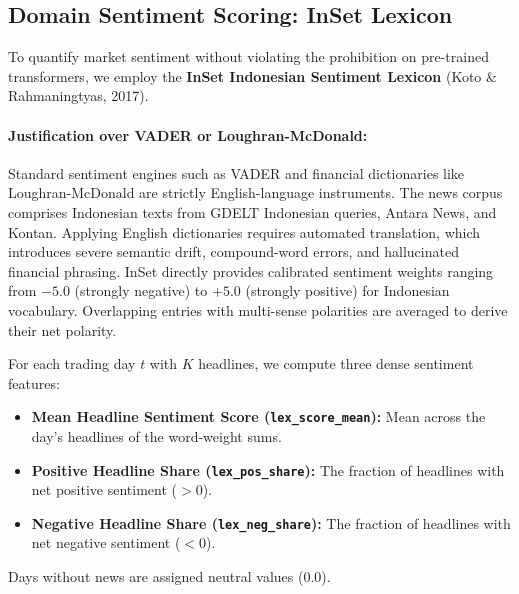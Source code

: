 \documentclass[10pt,a4paper]{article}
\begin{document}
\subsection{Domain Sentiment Scoring: InSet Lexicon}
To quantify market sentiment without violating the prohibition on pre-trained transformers, we employ the \textbf{InSet Indonesian Sentiment Lexicon} (Koto \& Rahmaningtyas, 2017).

\paragraph{Justification over VADER or Loughran-McDonald:} Standard sentiment engines such as VADER and financial dictionaries like Loughran-McDonald are strictly English-language instruments. The news corpus comprises Indonesian texts from GDELT Indonesian queries, Antara News, and Kontan. Applying English dictionaries requires automated translation, which introduces severe semantic drift, compound-word errors, and hallucinated financial phrasing. InSet directly provides calibrated sentiment weights ranging from $-5.0$ (strongly negative) to $+5.0$ (strongly positive) for Indonesian vocabulary. Overlapping entries with multi-sense polarities are averaged to derive their net polarity.

For each trading day $t$ with $K$ headlines, we compute three dense sentiment features:
\begin{itemize}[leftmargin=1.5em]
    \item \textbf{Mean Headline Sentiment Score (\texttt{lex\_score\_mean}):} Mean across the day's headlines of the word-weight sums.
    \item \textbf{Positive Headline Share (\texttt{lex\_pos\_share}):} The fraction of headlines with net positive sentiment ($>0$).
    \item \textbf{Negative Headline Share (\texttt{lex\_neg\_share}):} The fraction of headlines with net negative sentiment ($<0$).
\end{itemize}
Days without news are assigned neutral values ($0.0$).
\end{document}
